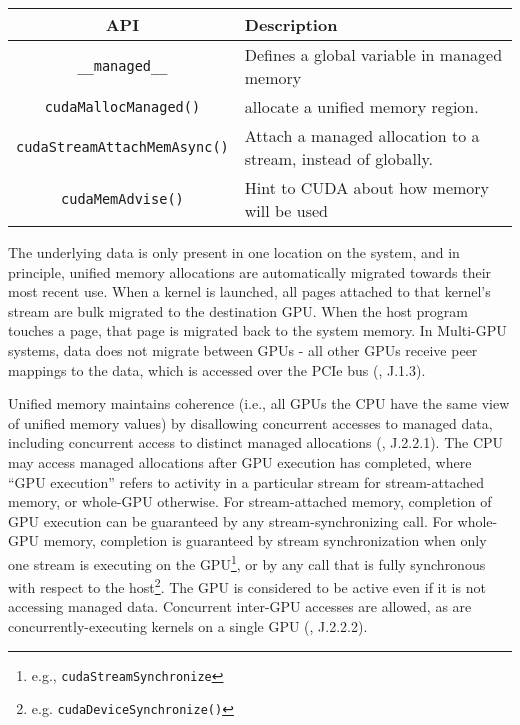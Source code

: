 \begin{table}[h]
	\centering
	\caption[CUDA Unified Memory-Management APIs]{}
	\label{tab:cuda-um-apis}
	\begin{tabularx}{\textwidth}{|c|Y|}
		\hline
		\textbf{API}                                              & \textbf{Description}                        \\ \hline
		\texttt{\_\_managed\_\_}                                  & Defines a global variable in managed memory \\ \hline
		\texttt{cudaMallocManaged()}                              & allocate a unified memory region.           \\ \hline
		\texttt{cudaStreamAttachMemAsync()}                       & Attach a managed allocation to a stream, instead of globally. \\ \hline
		\texttt{cudaMemAdvise()}                                  & Hint to CUDA about how memory will be used \\ \hline
	\end{tabularx}
\end{table}

The underlying data is only present in one location on the system, and in principle, unified memory allocations are automatically migrated towards their most recent use.
When a kernel is launched, all pages attached to that kernel's stream are bulk migrated to the destination GPU.
When the host program touches a page, that page is migrated back to the system memory.
In Multi-GPU systems, data does not migrate between GPUs - all other GPUs receive peer mappings to the data, which is accessed over the PCIe bus (\cite{nvidia2014cuda60}, J.1.3).

Unified memory maintains coherence (i.e., all GPUs the CPU have the same view of unified memory values) by disallowing concurrent accesses to managed data, including concurrent access to distinct managed allocations (\cite{nvidia2014cuda60}, J.2.2.1).
The CPU may access managed allocations after GPU execution has completed, where ``GPU execution'' refers to activity in a particular stream for stream-attached memory, or whole-GPU otherwise.
For stream-attached memory, completion of GPU execution can be guaranteed by any stream-synchronizing call.
For whole-GPU memory, completion is guaranteed by stream synchronization when only one stream is executing on the GPU\footnote{e.g., \texttt{cudaStreamSynchronize}}, or by any call that is fully synchronous with respect to the host\footnote{e.g. \texttt{cudaDeviceSynchronize()}}.
The GPU is considered to be active even if it is not accessing managed data.
Concurrent inter-GPU accesses are allowed, as are concurrently-executing kernels on a single GPU (\cite{nvidia2014cuda60}, J.2.2.2).

